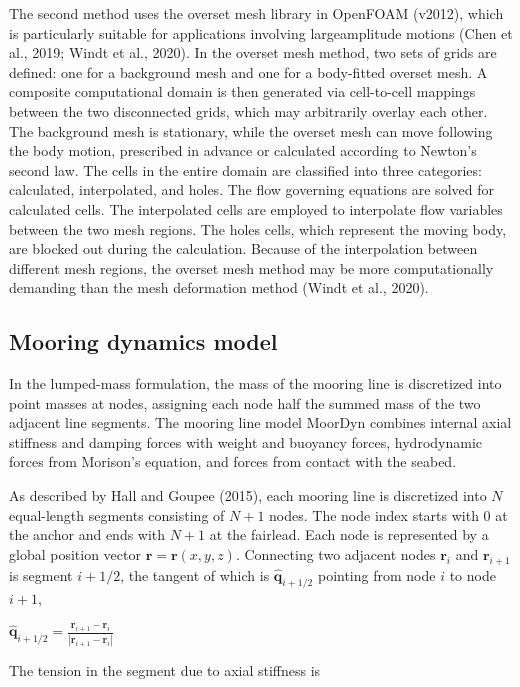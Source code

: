 The second method uses the overset mesh library in OpenFOAM (v2012), which is particularly suitable for applications involving largeamplitude motions (Chen et al., 2019; Windt et al., 2020). In the overset mesh method, two sets of grids are defined: one for a background mesh and one for a body-fitted overset mesh. A composite computational domain is then generated via cell-to-cell mappings between the two disconnected grids, which may arbitrarily overlay each other. The background mesh is stationary, while the overset mesh can move following the body motion, prescribed in advance or calculated according to Newton's second law. The cells in the entire domain are classified into three categories: calculated, interpolated, and holes. The flow governing equations are solved for calculated cells. The interpolated cells are employed to interpolate flow variables between the two mesh regions. The holes cells, which represent the moving body, are blocked out during the calculation. Because of the interpolation between different mesh regions, the overset mesh method may be more computationally demanding than the mesh deformation method (Windt et al., 2020).

\subsection{Mooring dynamics model}

In the lumped-mass formulation, the mass of the mooring line is discretized into point masses at nodes, assigning each node half the summed mass of the two adjacent line segments. The mooring line model MoorDyn combines internal axial stiffness and damping forces with weight and buoyancy forces, hydrodynamic forces from Morison's equation, and forces from contact with the seabed.

As described by Hall and Goupee (2015), each mooring line is discretized into $N$ equal-length segments consisting of $N+1$ nodes. The node index starts with 0 at the anchor and ends with $N+1$ at the fairlead. Each node is represented by a global position vector $\mathbf{r}=\mathbf{r}(x, y, z)$. Connecting two adjacent nodes $\mathbf{r}_{i}$ and $\mathbf{r}_{i+1}$ is segment $i+1 / 2$, the tangent of which is $\widehat{\mathbf{q}}_{i+1 / 2}$ pointing from node $i$ to node $i+1$,

$\widehat{\mathbf{q}}_{i+1 / 2}=\frac{\mathbf{r}_{i+1}-\mathbf{r}_{i}}{\left|\mathbf{r}_{i+1}-\mathbf{r}_{i}\right|}$

The tension in the segment due to axial stiffness is

